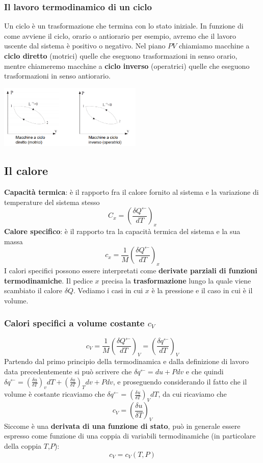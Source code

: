 \subsubsection{Il lavoro termodinamico di un ciclo}
Un ciclo è un trasformazione che termina con lo stato iniziale. In funzione di come avviene il ciclo, orario o antiorario per esempio, avremo che il lavoro uscente dal sistema è positivo o negativo. Nel
piano $PV$ chiamiamo macchine a \textbf{ciclo diretto} (motrici) quelle che eseguono trasformazioni in senso orario, mentre chiameremo macchine a \textbf{ciclo inverso} (operatrici) quelle che eseguono trasformazioni in senso antiorario.
\begin{center}
    \includegraphics[height=3cm]{../L03/img5.PNG}
\end{center}
\subsection{Il calore}
\textbf{Capacità termica}: è il rapporto fra il calore fornito al sistema e la variazione di temperature del sistema stesso
\[
    C_x = \left(\frac{\delta Q^\leftarrow }{d T}\right)_x
\]
\textbf{Calore specifico}: è il rapporto tra la capacità termica del sistema e la sua massa
\[
    c_x = \frac{1}{M}\left(\frac{\delta Q^\leftarrow }{dT}\right)_x
\]
I calori specifici possono essere interpretati come \textbf{derivate parziali di funzioni termodinamiche}.\newline
\newline
Il pedice $x$ precisa la \textbf{trasformazione} lungo la quale viene scambiato il calore $\delta Q$. Vediamo i casi in cui $x$ è la pressione e il caso in cui è il volume.
\subsubsection{Calori specifici a volume costante $c_V$}
\[
    c_V =\frac{1}{M}\left(\frac{\delta Q^\leftarrow }{dT}\right)_V = \left(\frac{\delta q^\leftarrow }{dT}\right)_V
\]
Partendo dal primo principio della termodinamica e dalla definizione di lavoro data precedentemente si può scrivere che $\delta q^\leftarrow  = d u + Pdv$ e che quindi $\delta q^\leftarrow  = \left(\frac{\delta u}{\delta T}\right)_vdT + \left(\frac{\delta u}{\delta T}\right)_T dv + Pdv$, e proseguendo considerando il fatto che il volume è costante ricaviamo che $\delta q^\leftarrow  = \left(\frac{\delta u}{\delta T}\right)_VdT$, da cui ricaviamo che 
\[
    c_V = \left( \frac{\delta u}{\delta T} \right)_V
\]
Siccome è una \textbf{derivata di una funzione di stato}, può in generale essere espresso come funzione di una coppia di variabili termodinamiche (in particolare della coppia $T$,$P$):
\[
    c_V = c_V(T,P)
\]
